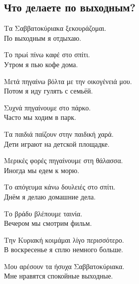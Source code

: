 \documentclass[12pt]{article}
\newcommand{\my}[1]{\textcolor{gray!80!white}{#1}}
\newenvironment{page}{\clearpage\normalsize\null\vfill}{\vfill\null}
\newenvironment{textblock}{\begin{minipage}{\textwidth}}{\end{minipage}\smallskip}
\begin{document}
	\begin{page}
		\subsection{Что делаете по выходным?}
		\small
		\begin{textblock}
			Τα Σαββατοκύριακα ξεκουράζομαι.\\
			\my{По выходным я отдыхаю.}
			
			Το πρωί πίνω καφέ στο σπίτι.\\
			\my{Утром я пью кофе дома.}
			
			Μετά πηγαίνω βόλτα με την οικογένειά μου.\\
			\my{Потом я иду гулять с семьёй.}
			
			Συχνά πηγαίνουμε στο πάρκο.\\
			\my{Часто мы ходим в парк.}
			
			Τα παιδιά παίζουν στην παιδική χαρά.\\
			\my{Дети играют на детской площадке.}
			
			Μερικές φορές πηγαίνουμε στη θάλασσα.\\
			\my{Иногда мы едем к морю.}
			
			Το απόγευμα κάνω δουλειές στο σπίτι.\\
			\my{Днём я делаю домашние дела.}
			
			Το βράδυ βλέπουμε ταινία.\\
			\my{Вечером мы смотрим фильм.}
			
			Την Κυριακή κοιμάμαι λίγο περισσότερο.\\
			\my{В воскресенье я сплю немного больше.}
			
			Μου αρέσουν τα ήσυχα Σαββατοκύριακα.\\
			\my{Мне нравятся спокойные выходные.}
		\end{textblock}
	\end{page}
	
\end{document}
